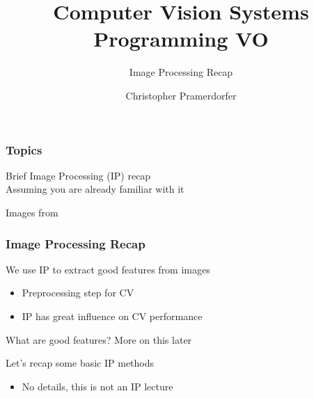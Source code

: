 \documentclass[xetex,professionalfont]{beamer}
\title{Computer Vision Systems Programming VO}
\subtitle{Image Processing Recap}
\author{Christopher Pramerdorfer}
\institute{Computer Vision Lab, Vienna University of Technology}
\renewcommand\emph[1]{\textcolor{tuwcvl_inf_red}{#1}}
\begin{document}

\begin{frame}
\maketitle
\end{frame}


\begin{frame}
\frametitle{Topics}

Brief \emph{Image Processing} (\emph{IP}) recap\\\medskip
Assuming you are already familiar with it

\bigskip
\begin{center}
    {\centering Images from \cite{prince12}}
\end{center}

\end{frame}


\begin{frame}
\frametitle{Image Processing Recap}

We use IP to extract good features from images
\begin{itemize}
    \item Preprocessing step for CV
    \item IP has great influence on CV performance
\end{itemize}

\bigskip
What are good features? More on this later

\bigskip
Let's recap some basic IP methods
\begin{itemize}
    \item No details, this is not an IP lecture
\end{itemize}

\end{frame}
\end{document}
